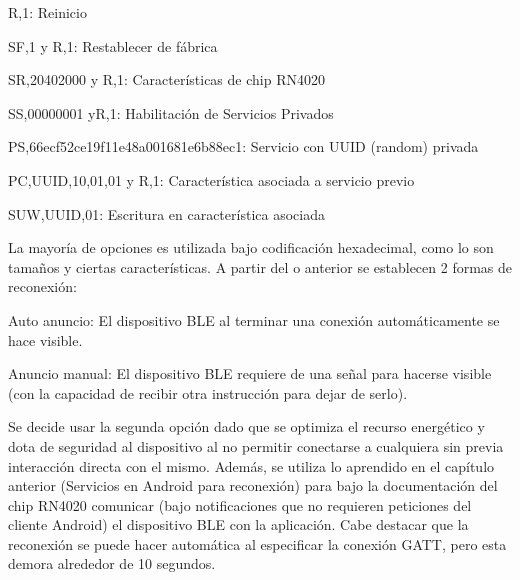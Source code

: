 	R,1: Reinicio

	SF,1 y R,1: Restablecer de fábrica

	SR,20402000 y R,1: Características de chip RN4020

	SS,00000001 yR,1: Habilitación de Servicios Privados

	PS,66ecf52ce19f11e48a001681e6b88ec1: Servicio con UUID (random) privada

	PC,UUID,10,01,01 y R,1: Característica asociada a servicio previo

	SUW,UUID,01: Escritura en característica asociada

La mayoría de opciones es utilizada bajo codificación hexadecimal, como lo son tamaños y ciertas características. A partir del o anterior se establecen 2 formas de reconexión: 

	Auto anuncio: El dispositivo BLE al terminar una conexión automáticamente se hace visible.

	Anuncio manual: El dispositivo BLE requiere de una señal para hacerse visible (con la capacidad de recibir otra instrucción para dejar de serlo).

Se decide usar la segunda opción dado que se optimiza el recurso energético y dota de seguridad al dispositivo al no permitir conectarse a cualquiera sin previa interacción directa con el mismo. Además, se utiliza lo aprendido en el capítulo anterior (Servicios en Android para reconexión) para bajo la documentación del chip RN4020 comunicar (bajo notificaciones que no requieren peticiones del cliente Android) el dispositivo BLE con la aplicación. Cabe destacar que la reconexión se puede hacer automática al especificar la conexión GATT, pero esta demora alrededor de 10 segundos.
